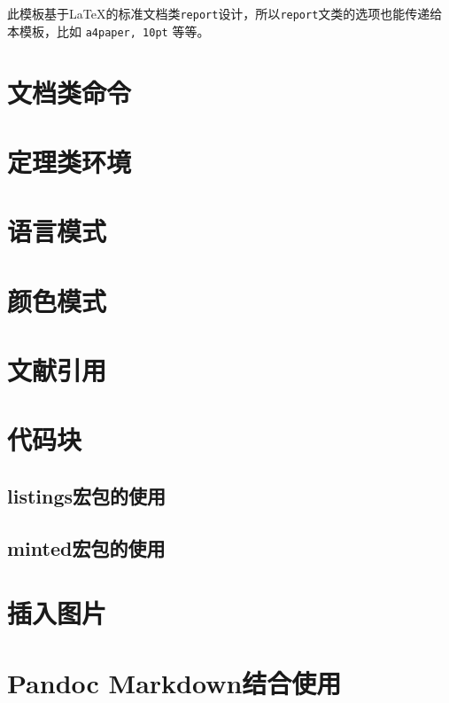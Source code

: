 \documentclass[12pt, textbook, green]{uglyrep}
\begin{document}
此模板基于\LaTeX{}的标准文档类\texttt{report}设计，所以\texttt{report}文类的选项也能传递给本模板，比如 \texttt{a4paper, 10pt} 等等。



\section{文档类命令}


\section{定理类环境}


\section{语言模式}


\section{颜色模式}\label{ssec:colors}


\section{文献引用}


\section{代码块}


\subsection{listings宏包的使用}

\subsection{minted宏包的使用}


\section{插入图片}


\section{Pandoc Markdown结合使用}
\end{document}
